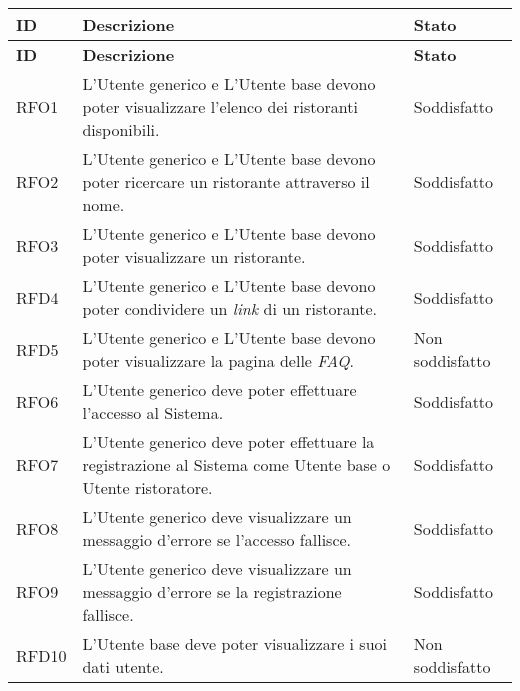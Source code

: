 \begin{longtable}{|l|p{}|p{3cm}|}
	\hline
	\textbf{ID} & \textbf{Descrizione}                                                                                                         & \textbf{Stato}  \\
	\endfirsthead
	\hline
	\textbf{ID} & \textbf{Descrizione}                                                                                                         & \textbf{Stato}  \\
	\hline
	\endhead
	\hline
	RFO1        & L'Utente generico e L'Utente base devono poter visualizzare l'elenco dei ristoranti disponibili.                             & Soddisfatto     \\
	\hline
	RFO2        & L'Utente generico e L'Utente base devono poter ricercare un ristorante attraverso il nome.                                   & Soddisfatto     \\
	\hline
	RFO3        & L'Utente generico e L'Utente base devono poter visualizzare un ristorante.                                                   & Soddisfatto     \\
	\hline
	RFD4        & L'Utente generico e L'Utente base devono poter condividere un \textit{link} di un ristorante.                                & Soddisfatto     \\
	\hline
	RFD5        & L'Utente generico e L'Utente base devono poter visualizzare la pagina delle  \textit{FAQ\g}.                                 & Non soddisfatto \\
	\hline
	RFO6        & L'Utente generico deve poter effettuare l'accesso al Sistema.                                                                & Soddisfatto     \\
	\hline
	RFO7        & L'Utente generico deve poter effettuare la registrazione al Sistema come Utente base o Utente ristoratore.                   & Soddisfatto     \\
	\hline
	RFO8        & L'Utente generico deve visualizzare un messaggio d'errore se l'accesso fallisce.                                             & Soddisfatto     \\
	\hline
	RFO9        & L'Utente generico deve visualizzare un messaggio d'errore se la registrazione fallisce.                                      & Soddisfatto     \\
	\hline
	RFD10       & L'Utente base deve poter visualizzare i suoi dati utente.                                                                    & Non soddisfatto \\

\end{longtable}
